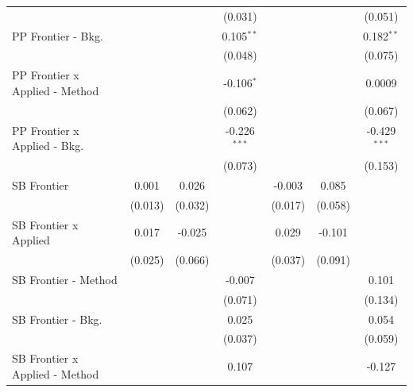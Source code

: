 \begin{tabular}{lcccccc}
                                  &                &              & (0.031)        &         &               & (0.051)\\   
   PP Frontier - Bkg.             &                &              & 0.105$^{**}$   &         &               & 0.182$^{**}$\\   
                                  &                &              & (0.048)        &         &               & (0.075)\\   
   PP Frontier x Applied - Method &                &              & -0.106$^{*}$   &         &               & 0.0009\\   
                                  &                &              & (0.062)        &         &               & (0.067)\\   
   PP Frontier x Applied - Bkg.   &                &              & -0.226$^{***}$ &         &               & -0.429$^{***}$\\   
                                  &                &              & (0.073)        &         &               & (0.153)\\   
   SB Frontier                    & 0.001          & 0.026        &                & -0.003  & 0.085         &   \\   
                                  & (0.013)        & (0.032)      &                & (0.017) & (0.058)       &   \\   
   SB Frontier x Applied          & 0.017          & -0.025       &                & 0.029   & -0.101        &   \\   
                                  & (0.025)        & (0.066)      &                & (0.037) & (0.091)       &   \\   
   SB Frontier - Method           &                &              & -0.007         &         &               & 0.101\\   
                                  &                &              & (0.071)        &         &               & (0.134)\\   
   SB Frontier - Bkg.             &                &              & 0.025          &         &               & 0.054\\   
                                  &                &              & (0.037)        &         &               & (0.059)\\   
   SB Frontier x Applied - Method &                &              & 0.107          &         &               & -0.127\\   

\end{tabular}
